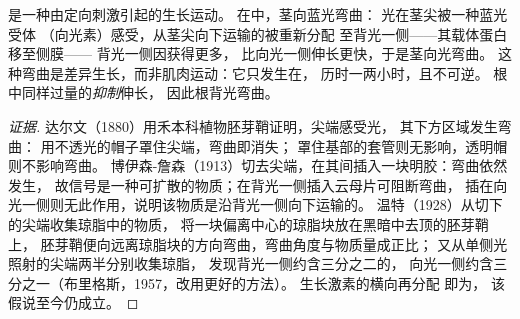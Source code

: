 \begin{proposition}[向光性]\label{prop:b2:plant-plasticity:phototropism}
\emph{}是一种由定向刺激引起的生长运动。
在\emph{}中，茎向蓝光弯曲：
光在茎尖被一种蓝光受体
（向光素）感受，从茎尖向下运输的被重新分配
至背光一侧——其载体蛋白移至侧膜——
背光一侧因获得更多，
比向光一侧伸长更快，于是茎向光弯曲。
这种弯曲是差异生长，而非肌肉运动：它只发生在，
历时一两小时，且不可逆。
根中同样过量的\emph{抑制}伸长，
因此根背光弯曲。
\end{proposition}
\begin{proof}[证据]
达尔文（1880）用禾本科植物胚芽鞘证明，尖端感受光，
其下方区域发生弯曲：
用不透光的帽子罩住尖端，弯曲即消失；
罩住基部的套管则无影响，透明帽则不影响弯曲。
博伊森-詹森（1913）切去尖端，在其间插入一块明胶：弯曲依然发生，
故信号是一种可扩散的物质；在背光一侧插入云母片可阻断弯曲，
插在向光一侧则无此作用，说明该物质是沿背光一侧向下运输的。
温特（1928）从切下的尖端收集琼脂中的物质，
将一块偏离中心的琼脂块放在黑暗中去顶的胚芽鞘上，
胚芽鞘便向远离琼脂块的方向弯曲，弯曲角度与物质量成正比；
又从单侧光照射的尖端两半分别收集琼脂，
发现背光一侧约含三分之二的，
向光一侧约含三分之一（布里格斯，1957，改用更好的方法）。
生长激素的横向再分配
即为，
该假说至今仍成立。
\end{proof}


